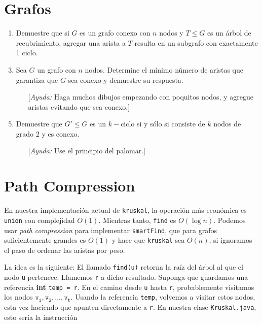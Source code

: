 \documentclass{amsart}
\begin{document}
\begin{large}
\section{Grafos}

\begin{enumerate}
	\item Demuestre que si $G$ es un grafo conexo con $n$ nodos y $T \leq G$ es un árbol de recubrimiento, agregar una arista a $T$ resulta en un subgrafo con exactamente 1 ciclo.
    \item[] 
    \item Sea $G$ un grafo con $n$ nodos. Determine el mínimo número de aristas que garantiza que $G$ sea conexo y demuestre su respuesta. \begin{itemize}
        \item[] [\emph{Ayuda:} Haga muchos dibujos empezando con poquitos nodos, y agregue aristas evitando que sea conexo.]
        \item[]
    \end{itemize}
    \item[] 
    \item Demuestre que $G' \leq G$ es un $k-$ciclo si y sólo si consiste de $k$ nodos de grado 2 y es conexo.
        \begin{itemize}
            \item[] [\emph{Ayuda:} Use el principio del palomar.]
        \end{itemize}
\end{enumerate}

\bigskip

\section{Path Compression} 

En nuestra implementación actual de \texttt{kruskal}, la operación más económica es \texttt{union} con complejidad $O(1)$. Mientras tanto, \texttt{find} es $O(\log n)$. Podemos usar \emph{path compression} para implementar \texttt{smartFind}, que para grafos suficientemente grandes es $O(1)$ y hace que \texttt{kruskal} sea $O(n)$, si ignoramos el paso de ordenar las aristas por peso.

La idea es la siguiente: El llamado \texttt{find(u)} retorna la raíz del árbol al que el nodo \texttt{u} pertenece. Llamemos \texttt{r} a dicho resultado. Suponga que guardamos una referencia \textbf{int} \texttt{temp = r}. En el camino desde \texttt{u} hasta \texttt{r}, probablemente visitamos los nodos $\mathtt{v_1, v_2,..., v_t}$. Usando la referencia \texttt{temp}, volvemos a visitar estos nodos, esta vez haciendo que apunten directamente a \texttt{r}. En nuestra clase \texttt{Kruskal.java}, esto sería la instrucción


\end{large}
\end{document}
